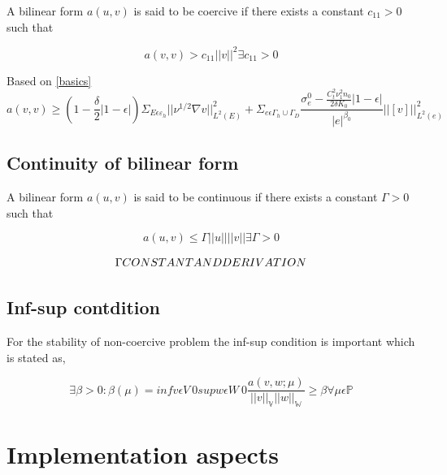 \documentclass[a4paper,12pt]{book}
\begin{document}
A bilinear form $a(u,v)$ is said to be coercive if there exists a constant $c_{11} > 0$ such that

\begin{equation}\label{Coercivity}
a(v,v) > c_{11} ||v||^2   \exists   c_{11} > 0
\end{equation}

Based on \ref{basics}
\begin{equation}\label{Coercivity_constant}
a(v,v) \geq (1-\frac{\delta}{2} |1-\epsilon|) \Sigma_{E \epsilon \varepsilon_h} ||\nu^{1/2} \nabla v ||^2_{L^2(E)} + \Sigma_{e \epsilon \Gamma_h \cup \Gamma_D} \frac{\sigma_e^0 - \frac{C_t^2 \nu_1^2 n_0}{2 \delta K_0}|1-\epsilon|}{|e|^{\beta_0}} ||[v]||^2_{L^2(e)}
\end{equation}

\section{Continuity of bilinear form}

A bilinear form $a(u,v)$ is said to be continuous if there exists a constant $\Gamma > 0$ such that

\begin{equation}\label{Continuity}
a(u,v) \leq \Gamma ||u||||v||   \exists   \Gamma > 0
\end{equation}


\begin{equation}\label{Continuity_constant}
\begin{Huge}
\Gamma CONSTANT AND DERIVATION
\end{Huge}
\end{equation}

\section{Inf-sup contdition}

For the stability of non-coercive problem the inf-sup condition is important which is stated as, \cite{crbm} 

\begin{equation}
\exists \beta > 0 : \beta(\mu) = inf v \epsilon V \ {0}  sup w \epsilon W \ {0} \frac{a(v,w;\mu)}{||v||_{\mathbb{V}} ||w||_{\mathbb{W}} } \geq \beta \forall \mu \epsilon \mathbb{P}
\end{equation}

\chapter{Implementation aspects} \label{implementation_aspects}
\end{document}
